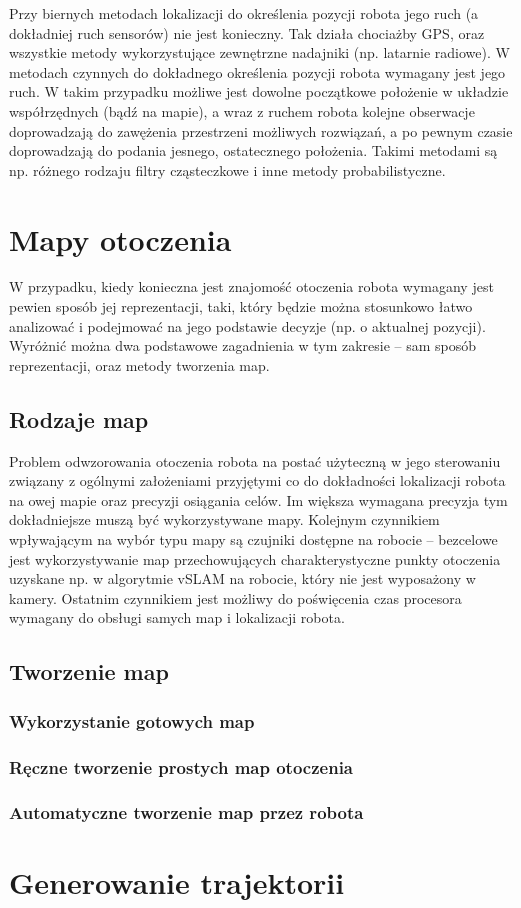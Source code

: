 Przy biernych metodach lokalizacji do określenia pozycji robota jego ruch
(a dokładniej ruch sensorów) nie jest konieczny. Tak działa chociażby GPS, oraz
wszystkie metody wykorzystujące zewnętrzne nadajniki (np. latarnie radiowe). W
metodach czynnych do dokładnego określenia pozycji robota wymagany jest jego
ruch. W takim przypadku możliwe jest dowolne początkowe położenie w układzie
współrzędnych (bądź na mapie), a wraz z ruchem robota kolejne obserwacje
doprowadzają do zawężenia przestrzeni możliwych rozwiązań, a po pewnym czasie
doprowadzają do podania jesnego, ostatecznego położenia. Takimi metodami są np.
różnego rodzaju filtry cząsteczkowe i inne metody probabilistyczne.

\section{Mapy otoczenia}

W przypadku, kiedy konieczna jest znajomość otoczenia robota wymagany jest pewien
sposób jej reprezentacji, taki, który będzie można stosunkowo łatwo analizować 
i podejmować na jego podstawie decyzje (np. o aktualnej pozycji). Wyróżnić
można dwa podstawowe zagadnienia w tym zakresie -- sam sposób reprezentacji,
oraz metody tworzenia map.

\subsection{Rodzaje map}

Problem odwzorowania otoczenia robota na postać użyteczną w jego sterowaniu 
związany z ogólnymi założeniami przyjętymi co do dokładności lokalizacji robota
na owej mapie oraz precyzji osiągania celów. Im większa wymagana precyzja
tym dokładniejsze muszą być wykorzystywane mapy. Kolejnym czynnikiem wpływającym
na wybór typu mapy są czujniki dostępne na robocie -- bezcelowe jest wykorzystywanie
map przechowujących charakterystyczne punkty otoczenia uzyskane np. w algorytmie
vSLAM na robocie, który nie jest wyposażony w kamery. Ostatnim czynnikiem
jest możliwy do poświęcenia czas procesora wymagany do obsługi samych map 
i lokalizacji robota.



\subsection{Tworzenie map}

\subsubsection{Wykorzystanie gotowych map}

\subsubsection{Ręczne tworzenie prostych map otoczenia}

\subsubsection{Automatyczne tworzenie map przez robota}

\section{Generowanie trajektorii}

